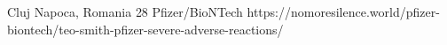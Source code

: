           {
            Cluj Napoca, Romania
          }
          {
          28
          }
          {
            Pfizer/BioNTech
          }
          {
          }
          {
          }
          {
            https://nomoresilence.world/pfizer-biontech/teo-smith-pfizer-severe-adverse-reactions/
          }

